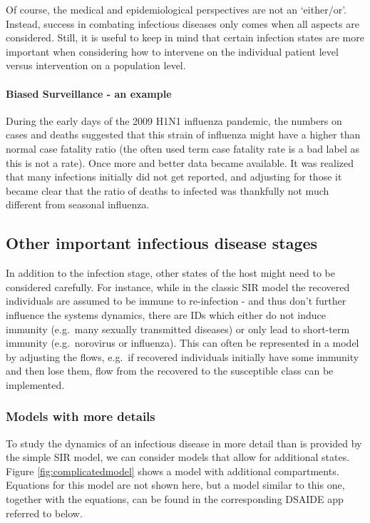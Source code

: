 \documentclass[]{article}
\let\oldparagraph\paragraph
\renewcommand{\paragraph}[1]{\oldparagraph{#1}\mbox{}}
\theoremstyle{definition}
\theoremstyle{definition}
\theoremstyle{definition}
\theoremstyle{remark}
\begin{document}
Of course, the medical and epidemiological perspectives are not an
`either/or'. Instead, success in combating infectious diseases only
comes when all aspects are considered. Still, it is useful to keep in
mind that certain infection states are more important when considering
how to intervene on the individual patient level versus intervention on
a population level.

\paragraph{Biased Surveillance - an example}\label{myexamplebox}

During the early days of the 2009 H1N1 influenza pandemic, the numbers
on cases and deaths suggested that this strain of influenza might have a
higher than normal case fatality ratio (the often used term case
fatality rate is a bad label as this is not a rate). Once more and
better data became available. It was realized that many infections
initially did not get reported, and adjusting for those it became clear
that the ratio of deaths to infected was thankfully not much different
from seasonal influenza.

\subsection{Other important infectious disease
stages}\label{other-important-infectious-disease-stages}

In addition to the infection stage, other states of the host might need
to be considered carefully. For instance, while in the classic SIR model
the recovered individuals are assumed to be immune to re-infection - and
thus don't further influence the systems dynamics, there are IDs which
either do not induce immunity (e.g.~many sexually transmitted diseases)
or only lead to short-term immunity (e.g.~norovirus or influenza). This
can often be represented in a model by adjusting the flows, e.g.~if
recovered individuals initially have some immunity and then lose them,
flow from the recovered to the susceptible class can be implemented.

\subsubsection{Models with more details}\label{models-with-more-details}

To study the dynamics of an infectious disease in more detail than is
provided by the simple SIR model, we can consider models that allow for
additional states. Figure \ref{fig:complicatedmodel} shows a model with
additional compartments. Equations for this model are not shown here,
but a model similar to this one, together with the equations, can be
found in the corresponding DSAIDE app referred to below.
\end{document}

